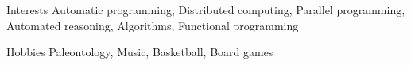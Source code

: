 \documentclass{resume} %
\begin{document}
\begin{rSection}{Interests}
    Automatic programming, Distributed computing, Parallel programming, Automated reasoning, Algorithms, Functional programming 
\end{rSection}

\begin{rSection}{Hobbies}
    Paleontology, Music, Basketball, Board games
\end{rSection}
\end{document}
